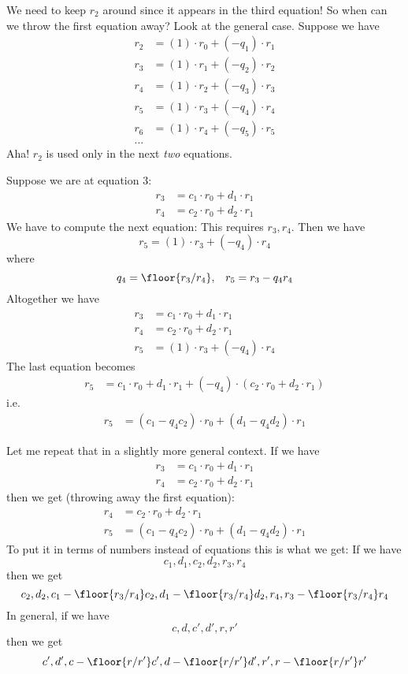We need to keep $r_2$ around since it appears in the third equation!
So when can we throw the first equation away?
Look at the general case.
Suppose we have
\begin{align*}
r_2 &= (1) \cdot r_0 + (-q_1) \cdot r_1  \\
r_3 &= (1) \cdot r_1 + (-q_2) \cdot r_2  \\
r_4 &= (1) \cdot r_2 + (-q_3) \cdot r_3  \\
r_5 &= (1) \cdot r_3 + (-q_4) \cdot r_4  \\
r_6 &= (1) \cdot r_4 + (-q_5) \cdot r_5  \\
...
\end{align*}
Aha! $r_2$ is used only in the next \textit{two} equations.

Suppose we are at equation 3:
\begin{align*}
r_3 &= c_1 \cdot r_0 + d_1 \cdot r_1  \\
r_4 &= c_2 \cdot r_0 + d_2 \cdot r_1 
\end{align*}
We have to compute the next equation:
This requires $r_3, r_4$.
Then we have
\[
r_5 = (1) \cdot r_3 + (-q_4) \cdot r_4
\]
where
\[
q_4 = \floor{r_3/r_4}, \,\,\,\,\, r_5 = r_3 - q_4r_4
\]
Altogether we have
\begin{align*}
r_3 &= c_1 \cdot r_0 + d_1 \cdot r_1     \\
r_4 &= c_2 \cdot r_0 + d_2 \cdot r_1     \\
r_5 &= (1) \cdot r_3 + (-q_4) \cdot r_4 
\end{align*}
The last equation becomes
\begin{align*}
r_5 &= c_1 \cdot r_0 + d_1 \cdot r_1  
+ 
(-q_4) \cdot (c_2 \cdot r_0 + d_2 \cdot r_1)
\end{align*}
i.e.
\begin{align*}
r_5 &= (c_1 - q_4 c_2) \cdot r_0 + (d_1 - q_4 d_2) \cdot r_1 
\end{align*}

Let me repeat that in a slightly more general context.
If we have
\begin{align*}
r_3 &= c_1 \cdot r_0 + d_1 \cdot r_1  \\
r_4 &= c_2 \cdot r_0 + d_2 \cdot r_1 
\end{align*}
then we get (throwing away the first equation):
\begin{align*}
r_4 &=c_2 \cdot r_0 + d_2 \cdot r_1 \\
r_5 &= (c_1 - q_4 c_2) \cdot r_0 + (d_1 - q_4 d_2) \cdot r_1 
\end{align*}
To put it in terms of numbers instead of equations this is what we get:
If we have
\[
c_1, d_1, c_2, d_2, r_3, r_4
\]
then we get
\[
c_2, d_2, 
c_1 - \floor{r_3/r_4} c_2, 
d_1 - \floor{r_3/r_4}d_2, 
r_4, r_3 - \floor{r_3/r_4}r_4
\]
In general, if we have
\[
c, d, c', d', r, r'
\]
then we get
\[
c', d', 
c - \floor{r/r'} c', d - \floor{r/r'}d', 
r', r - \floor{r/r'}r'
\]

